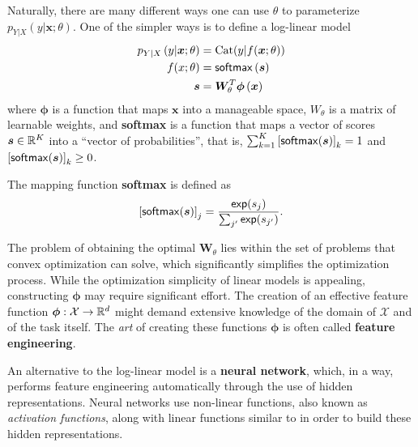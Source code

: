 \noindent Naturally, there are many different ways one can use $\theta$ to
parameterize $p_{Y|X}\left(y|\bm{x};\theta\right)$. One of the simpler ways
is to define a log-linear model
%
\begin{align}
    p_{Y|X}\left(y|\bm{x};\theta\right) & = \text{Cat}(y|f(\bm x; \theta)) \\
    f(x; \theta)                        & = \operatorname*{\mathsf{softmax}} \left(\bm{s}\right)   \\
    \bm{s}                              & 
    = \bm{W}_{\theta}^T\bm{\phi}\left(\bm{x}\right) \label{eq:linear}
\end{align}
%
where $\bm{\phi}$ is a function that maps $\bm{x}$ into a
manageable space, $W_{\theta}$ is a matrix of learnable weights, and
\textbf{softmax} is a function that maps a vector of scores $\bm{s}\in\mathbb{R}^K$ into
a ``vector of probabilities'', that is, $\sum_{k=1}^K\left[\operatorname*{\mathsf{softmax}}(\bm{s})\right]_k=1$
and $\left[\operatorname*{\mathsf{softmax}}(\bm{s})\right]_k \geq 0$.

\begin{definition}[softmax]
    The mapping function \textbf{softmax} is defined as
    \begin{equation}\label{eq:softmax}
        \left[\operatorname*{\mathsf{softmax}}(\bm{s})\right]_j = \frac{\operatorname*{\mathsf{exp}}(s_j)}{\sum_{j'} \operatorname*{\mathsf{exp}}(s_{j'})}.
    \end{equation}
\end{definition}

The problem of obtaining the optimal $\bm{W}_{\theta}$ lies
within the set of problems that convex optimization can solve, which
significantly simplifies the optimization process. While the
optimization simplicity of linear models is appealing, constructing
$\bm{\phi}$ may require significant effort. The creation of an
effective feature function $\bm{\phi}: \mathcal{X} \rightarrow \mathbb{R}^d$ might
demand extensive knowledge of the domain of $\mathcal{X}$ and of the
task itself. The \textit{art} of creating these functions $\bm{\phi}$
is often called \textbf{feature engineering}.

An alternative to the log-linear model is a \textbf{neural network}, which, in a
way, performs feature engineering automatically through the use of hidden
representations. Neural networks use non-linear functions, also known
as \textit{activation functions}, along with linear functions similar
to  in order to build these hidden representations.

